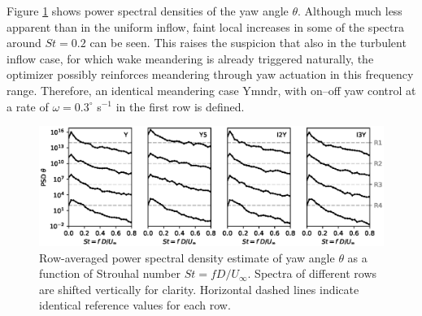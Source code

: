	Figure \ref{fig:spec_turbulent} shows power spectral densities of the yaw angle $\theta$. Although much less apparent than in the uniform inflow, faint local increases in some of the spectra around $St = 0.2$ can be seen. This raises the suspicion that also in the turbulent inflow case, for which wake meandering is already triggered naturally, the optimizer possibly reinforces meandering through yaw actuation in this frequency range. Therefore, an identical meandering case Ymndr, with on--off yaw control at a rate of $\omega = 0.3^\circ$ s$^{-1}$ in the first row is defined. 
	\begin{figure}
		\includegraphics[width=\textwidth]{chapters/optimal_yaw_control/PSD_turbulent.eps}
		\caption{Row-averaged power spectral density estimate of yaw angle $\theta$ as a function of Strouhal number $St = f D/U_\infty$. Spectra of different rows are shifted vertically for clarity. Horizontal dashed lines indicate identical reference values for each row.\label{fig:spec_turbulent}}
	\end{figure}
	
